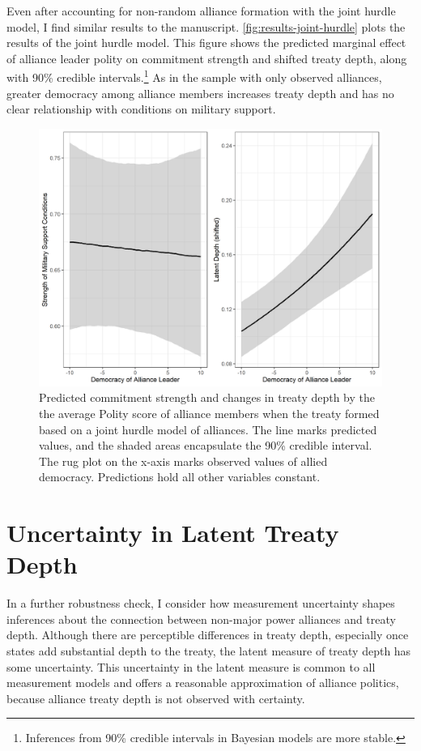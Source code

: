\documentclass[12pt]{article}
\begin{document}
Even after accounting for non-random alliance formation with the joint hurdle model, I find similar results to the manuscript. 
\autoref{fig:results-joint-hurdle} plots the results of the joint hurdle model. 
This figure shows the predicted marginal effect of alliance leader polity on commitment strength and shifted treaty depth, along with 90\% credible intervals.\footnote{Inferences from 90\% credible intervals in Bayesian models are more stable.} 
As in the sample with only observed alliances, greater democracy among alliance members increases treaty depth and has no clear relationship with conditions on military support. 


\begin{figure}
\includegraphics[width=.95\textwidth]{results-joint-hurdle.png}  
\caption{Predicted commitment strength and changes in treaty depth by the the average Polity score of alliance members when the treaty formed based on a joint hurdle model of alliances. The line marks predicted values, and the shaded areas encapsulate the 90\% credible interval. The rug plot on the x-axis marks observed values of allied democracy. Predictions hold all other variables constant.}
\label{fig:results-joint-hurdle}
\end{figure}




\section{Uncertainty in Latent Treaty Depth} 


In a further robustness check, I consider how measurement uncertainty shapes inferences about the connection between non-major power alliances and treaty depth. 
Although there are perceptible differences in treaty depth, especially once states add substantial depth to the treaty, the latent measure of treaty depth has some uncertainty. 
This uncertainty in the latent measure is common to all measurement models and offers a reasonable approximation of alliance politics, because alliance treaty depth is not observed with certainty.  
\end{document}
